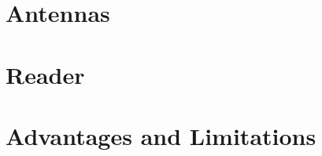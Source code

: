 \section{Antennas} \label{sec:antenna}


\section{Reader} \label{sec:reader}


\section{Advantages and Limitations}












\cleardoublepage